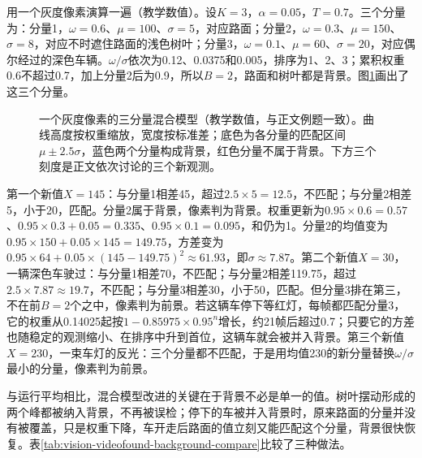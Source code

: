 用一个灰度像素演算一遍（教学数值）。设$K=3$，$\alpha=0.05$，$T=0.7$。三个分量为：分量1，$\omega=0.6$、$\mu=100$、$\sigma=5$，对应路面；分量2，$\omega=0.3$、$\mu=150$、$\sigma=8$，对应不时遮住路面的浅色树叶；分量3，$\omega=0.1$、$\mu=60$、$\sigma=20$，对应偶尔经过的深色车辆。$\omega/\sigma$依次为0.12、0.0375和0.005，排序为1、2、3；累积权重0.6不超过0.7，加上分量2后为0.9，所以$B=2$，路面和树叶都是背景。图\ref{fig:vision-videofound-background-mixture}画出了这三个分量。

\begin{figure}[htbp]
  \centering
  
  \caption{一个灰度像素的三分量混合模型（教学数值，与正文例题一致）。曲线高度按权重缩放，宽度按标准差；底色为各分量的匹配区间$\mu\pm2.5\sigma$，蓝色两个分量构成背景，红色分量不属于背景。下方三个刻度是正文依次讨论的三个新观测。}
  \label{fig:vision-videofound-background-mixture}
\end{figure}

第一个新值$X=145$：与分量1相差45，超过$2.5\times5=12.5$，不匹配；与分量2相差5，小于20，匹配。分量2属于背景，像素判为背景。权重更新为$0.95\times0.6=0.57$、$0.95\times0.3+0.05=0.335$、$0.95\times0.1=0.095$，和仍为1。分量2的均值变为$0.95\times150+0.05\times145=149.75$，方差变为$0.95\times64+0.05\times(145-149.75)^2\approx61.93$，即$\sigma\approx7.87$。第二个新值$X=30$，一辆深色车驶过：与分量1相差70，不匹配；与分量2相差119.75，超过$2.5\times7.87\approx19.7$，不匹配；与分量3相差30，小于50，匹配。但分量3排在第三，不在前$B=2$个之中，像素判为前景。若这辆车停下等红灯，每帧都匹配分量3，它的权重从0.14025起按$1-0.85975\times0.95^{n}$增长，约21帧后超过0.7；只要它的方差也随稳定的观测缩小、在排序中升到首位，这辆车就会被并入背景。第三个新值$X=230$，一束车灯的反光：三个分量都不匹配，于是用均值230的新分量替换$\omega/\sigma$最小的分量，像素判为前景。

与运行平均相比，混合模型改进的关键在于背景不必是单一的值。树叶摆动形成的两个峰都被纳入背景，不再被误检；停下的车被并入背景时，原来路面的分量并没有被覆盖，只是权重下降，车开走后路面的值立刻又能匹配这个分量，背景很快恢复。表\ref{tab:vision-videofound-background-compare}比较了三种做法。

